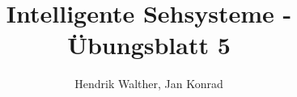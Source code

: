\documentclass[deutsch]{llncs}
\begin{document}
\title{Intelligente Sehsysteme - Übungsblatt 5}


\author{Hendrik Walther, Jan Konrad}
\institute{}
\maketitle

\newpage

\end{document}
